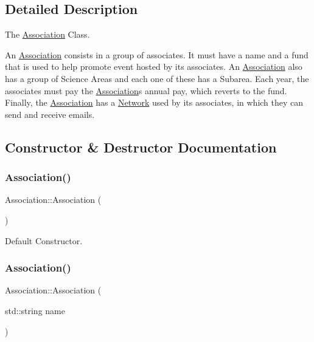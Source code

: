 \subsection{Detailed Description}
The \mbox{\hyperlink{classAssociation}{Association}} Class. 

An \mbox{\hyperlink{classAssociation}{Association}} consists in a group of associates. It must have a name and a fund that is used to help promote event hosted by it\textquotesingle{}s associates. An \mbox{\hyperlink{classAssociation}{Association}} also has a group of Science Areas and each one of these has a Subarea. Each year, the associates must pay the \mbox{\hyperlink{classAssociation}{Association}}\textquotesingle{}s annual pay, which reverts to the fund. Finally, the \mbox{\hyperlink{classAssociation}{Association}} has a \mbox{\hyperlink{classNetwork}{Network}} used by it\textquotesingle{}s associates, in which they can send and receive emails. 

\subsection{Constructor \& Destructor Documentation}
\mbox{\label{classAssociation_abf287524f5ab9abf66059e5fa959340b}} 
\subsubsection{\texorpdfstring{Association()}{Association()}\hspace{0.1cm}{\footnotesize\ttfamily [1/3]}}
{\footnotesize\ttfamily Association\+::\+Association (\begin{DoxyParamCaption}{ }\end{DoxyParamCaption})}



Default Constructor. 

\mbox{\label{classAssociation_a0773254cf0a1377e144a39b36c99d74d}} 
\subsubsection{\texorpdfstring{Association()}{Association()}\hspace{0.1cm}{\footnotesize\ttfamily [2/3]}}
{\footnotesize\ttfamily Association\+::\+Association (\begin{DoxyParamCaption}\item[{std\+::string}]{name }\end{DoxyParamCaption})}



